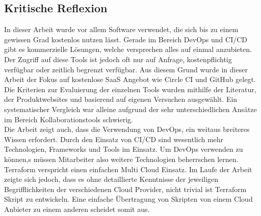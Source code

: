 \subsection{Kritische Reflexion}\label{kritische_reflexion}

In dieser Arbeit wurde vor allem Software verwendet, die sich bis zu einem gewissen Grad kostenlos nutzen lässt.
Gerade im Bereich DevOps und CI/CD gibt es kommerzielle Lösungen, welche versprechen alles auf einmal anzubieten.
Der Zugriff auf diese Tools ist jedoch oft nur auf Anfrage, kostenpflichtig verfügbar oder zeitlich begrenzt verfügbar.
Aus diesem Grund wurde in dieser Arbeit der Fokus auf kostenlose SaaS Angebot wie Circle CI und GitHub gelegt. \\

Die Kriterien zur Evaluierung der einzelnen Tools wurden mithilfe der Literatur, der Produktwebsites und basierend auf eigenen Versuchen ausgewählt.
Ein systematischer Vergleich war alleine aufgrund der sehr unterschiedlichen Ansätze im Bereich Kollaborationstools schwierig. \\

Die Arbeit zeigt auch, dass die Verwendung von DevOps, ein weitaus breiteres Wissen erfordert.
Durch den Einsatz von CI/CD sind wesentlich mehr Technologien, Frameworks und Tools im Einsatz.
Um DevOps verwenden zu können,s müssen Mitarbeiter also weitere Technologien beherrschen lernen. \\

Terraform verspricht einen einfachen Multi Cloud Einsatz.
Im Laufe der Arbeit zeigte sich jedoch, dass es ohne detaillierte Kenntnisse der jeweiligen Begrifflichkeiten der verschiedenen Cloud Provider,
nicht trivial ist Terraform Skript zu entwickeln.
Eine einfache Übertragung von Skripten von einem Cloud Anbieter zu einem anderen scheidet somit aus. \\
